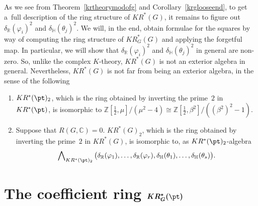 As we see from Theorem~\ref{krtheorymodofg} and Corollary~\ref{krglooseend}, to get a~full description of the ring
structure of $KR^*(G)$, it remains to f\/igure out $\delta_\mathbb{R}(\varphi_i)^2$ and $\delta_\mathbb{H}(\theta_j)^2$.
We will, in the end, obtain formulae for the squares by way of computing the ring structure of $KR_G^*(G)$ and applying
the forgetful map.
In particular, we will show that $\delta_\mathbb{R}(\varphi_i)^2$ and $\delta_\mathbb{H}(\theta_j)^2$ in general are
non-zero.
So, unlike the complex $K$-theory, $KR^*(G)$ is not an exterior algebra in general.
Nevertheless, $KR^*(G)$ is not far from being an exterior algebra, in the sense of the following
\begin{Corollary}\quad
\begin{enumerate}\itemsep=0pt
\item[$1.$]
$KR^*(\pt)_2$, which is the ring obtained by inverting the prime~$2$ in $KR^*(\pt)$, is isomorphic to
$\mathbb{Z}\left[\frac{1}{2}, \mu\right]/(\mu^2-4)\cong\mathbb{Z}\left[\frac{1}{2}, \beta^2\right]/((\beta^2)^2-1)$.
\item[$2.$]
Suppose that $R(G, \mathbb{C})=0$.
$KR^*(G)_2$, which is the ring obtained by inverting the prime~$2$ in $KR^*(G)$, is isomorphic to, as
$KR^*(\pt)_2$-algebra
\begin{gather*}
\bigwedge\nolimits_{KR^*(\pt)_2}\big(\delta_\mathbb{R}(\varphi_1), \dots, \delta_\mathbb{R}(\varphi_r),
\delta_\mathbb{H}(\theta_1), \dots, \delta_\mathbb{H}(\theta_s)\big).
\end{gather*}
\end{enumerate}
\end{Corollary}

\section[The coef\/f\/icient ring $KR_G^*(\pt)$]{The coef\/f\/icient ring $\boldsymbol{KR_G^*(\pt)}$}\label{Section3}

